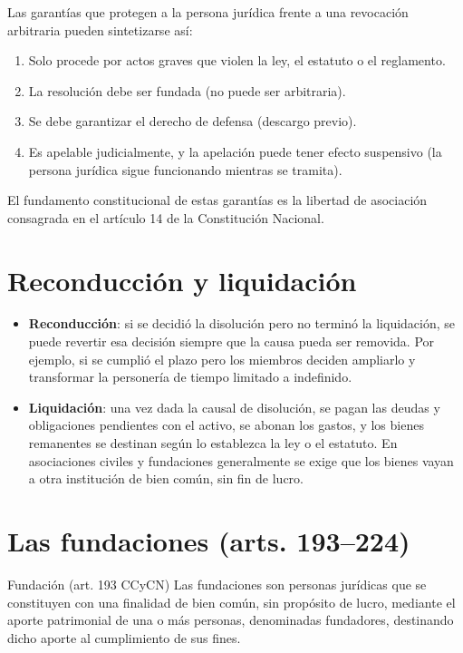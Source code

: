 \documentclass[12pt,oneside]{book}
\begin{document}
Las garantías que protegen a la persona jurídica frente a una revocación arbitraria pueden sintetizarse así:

\begin{enumerate}
    \item Solo procede por actos graves que violen la ley, el estatuto o el reglamento.
    \item La resolución debe ser fundada (no puede ser arbitraria).
    \item Se debe garantizar el derecho de defensa (descargo previo).
    \item Es apelable judicialmente, y la apelación puede tener efecto suspensivo (la persona jurídica sigue funcionando mientras se tramita).
\end{enumerate}

El fundamento constitucional de estas garantías es la libertad de asociación consagrada en el artículo 14 de la Constitución Nacional.

\section{Reconducción y liquidación}

\begin{itemize}
    \item \textbf{Reconducción}: si se decidió la disolución pero no terminó la liquidación, se puede revertir esa decisión siempre que la causa pueda ser removida. Por ejemplo, si se cumplió el plazo pero los miembros deciden ampliarlo y transformar la personería de tiempo limitado a indefinido.
    \item \textbf{Liquidación}: una vez dada la causal de disolución, se pagan las deudas y obligaciones pendientes con el activo, se abonan los gastos, y los bienes remanentes se destinan según lo establezca la ley o el estatuto. En asociaciones civiles y fundaciones generalmente se exige que los bienes vayan a otra institución de bien común, sin fin de lucro.
\end{itemize}

\section{Las fundaciones (arts. 193--224)}

\begin{definition}{Fundación (art. 193 CCyCN)}
Las fundaciones son personas jurídicas que se constituyen con una finalidad de bien común, sin propósito de lucro, mediante el aporte patrimonial de una o más personas, denominadas fundadores, destinando dicho aporte al cumplimiento de sus fines.
\end{definition}
\end{document}
